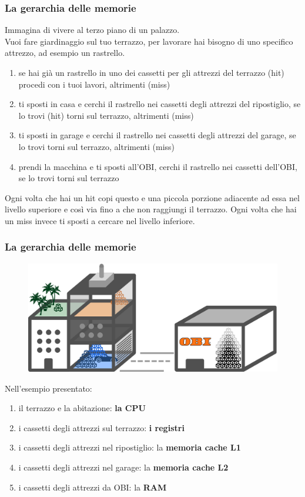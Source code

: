 \begin{frame}
	\frametitle{La gerarchia delle memorie}
	 
	 Immagina di vivere al terzo piano di un palazzo.\\
	 Vuoi fare giardinaggio sul tuo terrazzo, per lavorare hai bisogno di uno specifico attrezzo, ad esempio un rastrello. \pause
	 \begin{enumerate}
	 	\item se hai già un rastrello in uno dei cassetti per gli attrezzi del terrazzo (hit) procedi con i tuoi lavori, altrimenti (miss) \pause
	 	\item ti sposti in casa e cerchi il rastrello nei cassetti degli attrezzi del ripostiglio, se lo trovi (hit) torni sul terrazzo, altrimenti (miss) \pause
	 	\item ti sposti in garage e cerchi il rastrello nei cassetti degli attrezzi del garage, se lo trovi torni sul terrazzo, altrimenti (miss) \pause
	 	\item prendi la macchina e ti sposti all'OBI, cerchi il rastrello nei cassetti dell'OBI, se lo trovi torni sul terrazzo \pause
	 \end{enumerate}
	 Ogni volta che hai un hit copi questo e una piccola porzione adiacente ad essa nel livello superiore e così via fino a che non raggiungi il terrazzo. \pause
	 Ogni volta che hai un miss invece ti sposti a cercare nel livello inferiore.
	
\end{frame}


\begin{frame}
	\frametitle{La gerarchia delle memorie}
	
	\begin{figure}[!htbp] 
		\centering
		\includegraphics[width=0.6\linewidth]{images/5_memory/gardening.pdf}
	\end{figure}
	 \pause
	 Nell'esempio presentato: \pause
	 \begin{enumerate}
	 	\item il terrazzo e la abitazione: \pause \textbf{la CPU} \pause
	 	\item i cassetti degli attrezzi sul terrazzo: \pause \textbf{i registri} \pause
	 	\item i cassetti degli attrezzi nel ripostiglio: \pause la \textbf{memoria cache L1} \pause
	 	\item i cassetti degli attrezzi nel garage: \pause la \textbf{memoria cache L2} \pause
	 	\item i cassetti degli attrezzi da OBI: \pause la \textbf{RAM}
	 \end{enumerate}
	
\end{frame}


